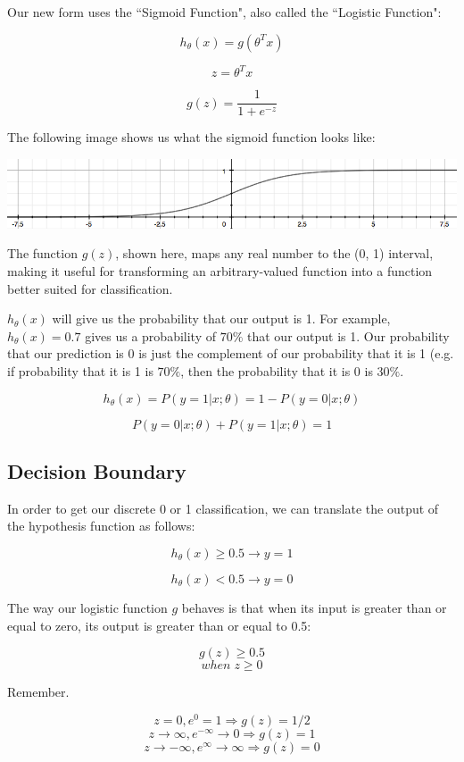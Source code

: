 \documentclass[UTF8]{article}
\begin{document}
Our new form uses the ``Sigmoid Function", also called the ``Logistic Function":

\[ h_\theta (x) = g ( \theta^T x )\] 

\[z = \theta^T x \]

\[g(z) = \dfrac{1}{1 + e^{-z}} \]

The following image shows us what the sigmoid function looks like:

\includegraphics[width = .8\textwidth]{NotePics/6_2_1.png}

The function $g(z)$, shown here, maps any real number to the (0, 1) interval, making it useful for transforming an arbitrary-valued function into a function better suited for classification.

$h_\theta(x)$ will give us the probability that our output is 1. For example, $h_\theta(x) = 0.7$ gives us a probability of $70\%$ that our output is 1. Our probability that our prediction is 0 is just the complement of our probability that it is 1 (e.g. if probability that it is 1 is $70\%$, then the probability that it is 0 is $30\%$.

\[h_\theta(x) = P(y=1 | x ; \theta) = 1 - P(y=0 | x ; \theta)\]

\[P(y = 0 | x;\theta) + P(y = 1 | x ; \theta) = 1\]

\subsection{Decision Boundary}

In order to get our discrete 0 or 1 classification, we can translate the output of the hypothesis function as follows:

\[ h_\theta(x) \geq 0.5 \rightarrow y = 1 \]

\[ h_\theta(x) < 0.5 \rightarrow y = 0 \]

The way our logistic function $g$ behaves is that when its input is greater than or equal to zero, its output is greater than or equal to 0.5:

\[ g(z) \geq 0.5 \]
\[ when \; z \geq 0 \]

Remember.

\[z=0, e^{0}=1 \Rightarrow g(z)=1/2\]
\[ z \to \infty, e^{-\infty} \to 0 \Rightarrow g(z)=1 \]
\[ z \to -\infty, e^{\infty}\to \infty \Rightarrow g(z)=0 \]
\end{document}
